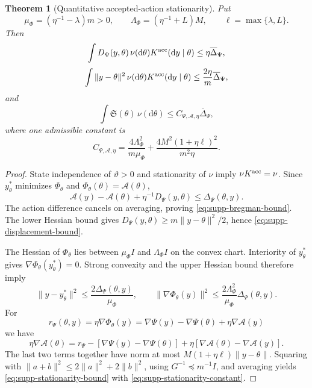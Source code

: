 \documentclass[11pt]{article}
\newtheorem{theorem}{Theorem}[section]
\numberwithin{equation}{section}
\theoremstyle{definition}
\theoremstyle{remark}
\newcommand{\dd}{\mathrm d}
\begin{document}
\begin{theorem}[Quantitative accepted-action stationarity]
\label{thm:supp-action-stationarity}
Put
\begin{equation}
 \mu_\Phi=(\eta^{-1}-\lambda)m>0,\qquad
 \Lambda_\Phi=(\eta^{-1}+L)M,\qquad
 \ell=\max\{\lambda,L\}.
 \label{eq:supp-action-constants}
\end{equation}
Then
\begin{equation}
 \int D_\Psi(y,\theta)\,
       \nu(\dd\theta)K^{\rm acc}(\dd y\mid\theta)
       \le\eta\overline\Delta_\Psi,
 \label{eq:supp-bregman-bound}
\end{equation}
\begin{equation}
 \int\|y-\theta\|^2\,
       \nu(\dd\theta)K^{\rm acc}(\dd y\mid\theta)
       \le\frac{2\eta}{m}\overline\Delta_\Psi,
 \label{eq:supp-displacement-bound}
\end{equation}
and
\begin{equation}
 \int\mathfrak S(\theta)\,\nu(\dd\theta)
       \le C_{\Psi,\mathcal A,\eta}\overline\Delta_\Psi,
 \label{eq:supp-stationarity-bound}
\end{equation}
where one admissible constant is
\begin{equation}
 C_{\Psi,\mathcal A,\eta}
 =\frac{4\Lambda_\Phi^2}{m\mu_\Phi}
   +\frac{4M^2(1+\eta\ell)^2}{m^2\eta}.
 \label{eq:supp-stationarity-constant}
\end{equation}
\end{theorem}
\begin{proof}
State independence of $\vartheta>0$ and stationarity of $\nu$ imply
$\nu K^{\rm acc}=\nu$.  Since $y_\theta^*$ minimizes $\Phi_\theta$ and
$\Phi_\theta(\theta)=\mathcal A(\theta)$,
\[
 \mathcal A(y)-\mathcal A(\theta)+\eta^{-1}D_\Psi(y,\theta)
       \le\Delta_\Psi(\theta,y).
\]
The action difference cancels on averaging, proving
\eqref{eq:supp-bregman-bound}.  The lower Hessian bound gives
$D_\Psi(y,\theta)\ge m\|y-\theta\|^2/2$, hence
\eqref{eq:supp-displacement-bound}.

The Hessian of $\Phi_\theta$ lies between $\mu_\Phi I$ and
$\Lambda_\Phi I$ on the convex chart.  Interiority of $y_\theta^*$ gives
$\nabla\Phi_\theta(y_\theta^*)=0$.  Strong convexity and the upper Hessian
bound therefore imply
\[
 \|y-y_\theta^*\|^2\le\frac{2\Delta_\Psi(\theta,y)}{\mu_\Phi},
 \qquad
 \|\nabla\Phi_\theta(y)\|^2
       \le\frac{2\Lambda_\Phi^2}{\mu_\Phi}\Delta_\Psi(\theta,y).
\]
For
\[
 r_\Psi(\theta,y)=\eta\nabla\Phi_\theta(y)
       =\nabla\Psi(y)-\nabla\Psi(\theta)+\eta\nabla\mathcal A(y)
\]
we have
\[
 \eta\nabla\mathcal A(\theta)
 =r_\Psi-[\nabla\Psi(y)-\nabla\Psi(\theta)]
       +\eta[\nabla\mathcal A(\theta)-\nabla\mathcal A(y)].
\]
The last two terms together have norm at most
$M(1+\eta\ell)\|y-\theta\|$.  Squaring with
$\|a+b\|^2\le2\|a\|^2+2\|b\|^2$, using $G^{-1}\preceq m^{-1}I$, and
averaging yields \eqref{eq:supp-stationarity-bound} with
\eqref{eq:supp-stationarity-constant}.
\end{proof}
\end{document}
